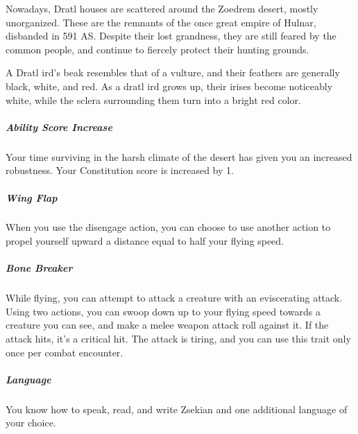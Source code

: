     Nowadays, Dratl houses are scattered around the Zoedrem desert, mostly unorganized.
    These are the remnants of the once great empire of Hulnar, disbanded in 591 AS.
    Despite their lost grandness, they are still feared by the common people, and continue to fiercely protect their hunting grounds.

    A Dratl ird's beak resembles that of a vulture, and their feathers are generally black, white, and red.
    As a dratl ird grows up, their irises become noticeably white, while the sclera surrounding them turn into a bright red color.

    \subparagraph{Ability Score Increase} Your time surviving in the harsh climate of the desert has given you an increased robustness.
    Your Constitution score is increased by 1.

    \subparagraph{Wing Flap} When you use the disengage action, you can choose to use another action to propel yourself upward a distance equal to half your flying speed.

    \subparagraph{Bone Breaker} While flying, you can attempt to attack a creature with an eviscerating attack.
    Using two actions, you can swoop down up to your flying speed towards a creature you can see, and make a melee weapon attack roll against it.
    If the attack hits, it's a critical hit.
    The attack is tiring, and you can use this trait only once per combat encounter.

    \subparagraph{Language} You know how to speak, read, and write Zsekian and one additional language of your choice.


\newpage
